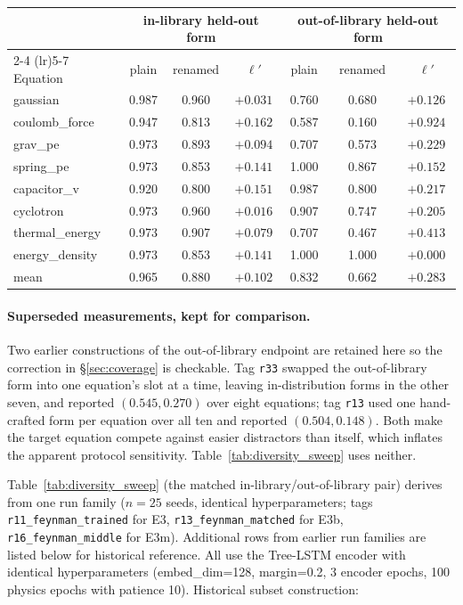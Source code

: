 \begin{center}\small
\begin{tabular}{l cc c cc c}
\toprule
& \multicolumn{3}{c}{in-library held-out form} & \multicolumn{3}{c}{out-of-library held-out form} \\
\cmidrule(lr){2-4} \cmidrule(lr){5-7}
Equation & plain & renamed & $\ell'$ & plain & renamed & $\ell'$ \\
\midrule
gaussian        & 0.987 & 0.960 & $+0.031$ & 0.760 & 0.680 & $+0.126$ \\
coulomb\_force  & 0.947 & 0.813 & $+0.162$ & 0.587 & 0.160 & $+0.924$ \\
grav\_pe        & 0.973 & 0.893 & $+0.094$ & 0.707 & 0.573 & $+0.229$ \\
spring\_pe      & 0.973 & 0.853 & $+0.141$ & 1.000 & 0.867 & $+0.152$ \\
capacitor\_v    & 0.920 & 0.800 & $+0.151$ & 0.987 & 0.800 & $+0.217$ \\
cyclotron       & 0.973 & 0.960 & $+0.016$ & 0.907 & 0.747 & $+0.205$ \\
thermal\_energy & 0.973 & 0.907 & $+0.079$ & 0.707 & 0.467 & $+0.413$ \\
energy\_density & 0.973 & 0.853 & $+0.141$ & 1.000 & 1.000 & $+0.000$ \\
\midrule
mean            & 0.965 & 0.880 & $+0.102$ & 0.832 & 0.662 & $+0.283$ \\
\bottomrule
\end{tabular}
\end{center}

\paragraph{Superseded measurements, kept for comparison.} Two earlier constructions of the
out-of-library endpoint are retained here so the correction in \S\ref{sec:coverage} is checkable.
Tag \texttt{r33} swapped the out-of-library form into one equation's slot at a time, leaving
in-distribution forms in the other seven, and reported $(0.545, 0.270)$ over eight equations; tag
\texttt{r13} used one hand-crafted form per equation over all ten and reported $(0.504, 0.148)$.
Both make the target equation compete against easier distractors than itself, which inflates the
apparent protocol sensitivity. Table~\ref{tab:diversity_sweep} uses neither.

Table~\ref{tab:diversity_sweep} (the matched in-library/out-of-library pair) derives from one run family ($n{=}25$ seeds, identical hyperparameters; tags \texttt{r11\_feynman\_trained} for E3, \texttt{r13\_feynman\_matched} for E3b, \texttt{r16\_feynman\_middle} for E3m). Additional rows from earlier run families are listed below for historical reference. All use the Tree-LSTM encoder with identical hyperparameters (embed\_dim=128, margin=0.2, 3 encoder epochs, 100 physics epochs with patience 10). Historical subset construction:


